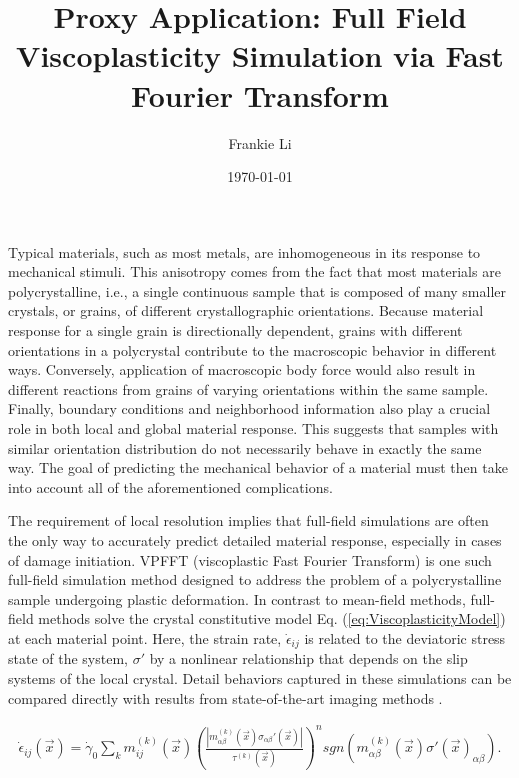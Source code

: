 \documentclass[11pt]{article}
\title{
  Proxy Application:  Full Field Viscoplasticity Simulation via Fast Fourier Transform
}
\author{
  Frankie Li
}
\date{
  \today
     }
\newcommand{\RefEq}[1] {Eq. (\ref{#1})}
\begin{document}
 
\newcommand{\captionfonts}{\slshape}

\makeatletter  %
\long\def\@makecaption#1#2{%
  \vskip\abovecaptionskip
  \sbox\@tempboxa{{\captionfonts #1: #2}}%
  \ifdim \wd\@tempboxa >\hsize
    {\captionfonts #1: #2\par}
  \else
    \hbox to\hsize{\hfil\box\@tempboxa\hfil}%
  \fi
  \vskip\belowcaptionskip}
\makeatother   %
 
 Typical materials, such as most metals, are inhomogeneous in its response to mechanical stimuli. This anisotropy comes from the fact that most materials are polycrystalline, i.e., a single continuous sample that is composed of many smaller crystals, or grains, of different crystallographic orientations. Because material response for a single grain is directionally dependent, grains with different orientations in a polycrystal contribute to the macroscopic behavior in different ways. Conversely, application of macroscopic body force would also result in different reactions from grains of varying orientations within the same sample.  Finally, boundary conditions and neighborhood information also play a crucial role in both local and global material response.  This suggests that samples with similar orientation distribution do not necessarily behave in exactly the same way.  The goal of predicting the mechanical behavior of a material must then take into account all of the aforementioned complications.
  
The requirement of local resolution implies that full-field simulations are often the only way to accurately predict detailed material response, especially in cases of damage initiation. VPFFT (viscoplastic Fast Fourier Transform) \cite{Lebensohn2001} is one such full-field simulation method designed to address the problem of a polycrystalline sample undergoing plastic deformation.  In contrast to mean-field methods, full-field methods solve the crystal constitutive model \RefEq{eq:ViscoplasticityModel} at each material point.  Here, the strain rate, $\dot{\epsilon}_{ij}$ is related to the deviatoric stress state of the system, $\sigma'$ by a nonlinear relationship that depends on the slip systems of the local crystal.  Detail behaviors captured in these simulations can be compared directly with results from state-of-the-art imaging methods \cite{Lebensohn_2008}.  


\begin{eqnarray}
\dot{ \epsilon }_{ij} \left( \vec{x} \right) = \dot{ \gamma }_0 \sum_{k} m_{ij}^{(k)}( \vec{x}) 
\left(
\frac{|m^{(k)}_{\alpha \beta }(\vec{x}) \sigma_{\alpha \beta} '(\vec{x}) |}{\tau^{(k)}(\vec{x}) }
 \right )^n
sgn \left( m^{(k)}_{\alpha \beta}(\vec{x}) \sigma'(\vec{x})_{\alpha \beta} \right).
\label{eq:ViscoplasticityModel}
\end{eqnarray}
\end{document}
